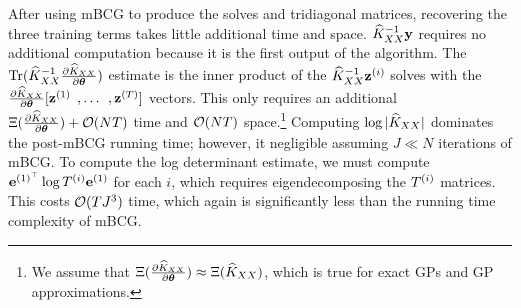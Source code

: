 After using mBCG to produce the solves and tridiagonal matrices, recovering the three training terms takes little additional time and space.
$\widehat{K}_{XX}^{-1}\mathbf{y}$ requires no additional computation because it is the first output of the algorithm.
The $\tr{\trainK^{-1}\frac{\partial \trainK}{\partial \btheta}}$ estimate is the inner product of the $\widehat{K}_{XX}^{-1} \mathbf{z}^{(i)}$ solves with the $\frac{\partial \widehat{K}_{XX}}{\partial \boldsymbol{\theta}}[\mathbf{z}^{(1)} \:\:, \ldots \:\:, \mathbf{z}^{(T)}]$ vectors.
This only requires an additional $\mmm{\frac{\partial \trainK}{\partial \btheta}} + \bigo{NT}$ time and $\bigo{NT}$ space.\footnote{
	We assume that $\Xi (\frac{\partial \widehat{K}_{XX}}{\partial \boldsymbol{\theta}}) \approx \Xi (\widehat{K}_{XX})$, which is true for exact GPs and GP approximations.
}
Computing $\log \vert \widehat{K}_{XX} \vert$ dominates the post-mBCG running time; however, it negligible assuming $J \ll N$ iterations of mBCG.
To compute the log determinant estimate, we must compute $\mathbf{e}^{(1)^\top} \log T^{(i)} \mathbf{e}^{(1)}$ for each $i$, which requires eigendecomposing the $T^{(i)}$ matrices.
This costs $\bigo{T J^3}$ time, which again is significantly less than the running time complexity of mBCG.
